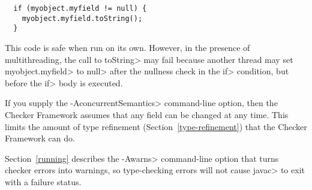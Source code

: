 \begin{Verbatim}
  if (myobject.myfield != null) {
    myobject.myfield.toString();
  }
\end{Verbatim}

\noindent
This code is safe when run on its own.
However, in the presence of multithreading, the call to \<toString> may
fail because another thread may set \<myobject.myfield> to \<null> after
the nullness check in the \<if> condition, but before the \<if> body is
executed.

If you supply the \<-AconcurrentSemantics> command-line option, then the
Checker Framework assumes that any field can be changed at any time.  This
limits the amount of type refinement
(Section~\ref{type-refinement}) that the Checker Framework can do.


%
%
%
%
%
%
%



Section~\ref{running} describes the \<-Awarns> command-line
option that turns checker errors into warnings, so type-checking errors
will not cause \<javac> to exit with a failure status.



